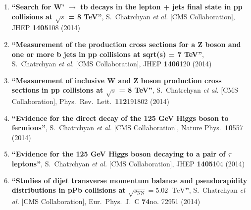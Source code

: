 \begin{enumerate}
\item%
{\bf ``Search for W' $\to $ tb decays in the lepton + jets final state in pp collisions at $\sqrt{s}$ = 8 TeV''}, 
  S.~Chatrchyan {\it et al.}  [CMS Collaboration], 
JHEP {\bf 1405}108 (2014) %


\item%
{\bf ``Measurement of the production cross sections for a Z boson and one or more b jets in pp collisions at sqrt(s) = 7 TeV''}, 
  S.~Chatrchyan {\it et al.}  [CMS Collaboration], 
JHEP {\bf 1406}120 (2014) %


\item%
{\bf ``Measurement of inclusive W and Z boson production cross sections in pp collisions at $\sqrt{s}$ = 8 TeV''}, 
  S.~Chatrchyan {\it et al.}  [CMS Collaboration], 
Phys.\ Rev.\ Lett.\  {\bf 112}191802 (2014) %


\item%
{\bf ``Evidence for the direct decay of the 125 GeV Higgs boson to fermions''}, 
  S.~Chatrchyan {\it et al.}  [CMS Collaboration], 
Nature Phys.\  {\bf 10}557 (2014) %


\item%
{\bf ``Evidence for the 125 GeV Higgs boson decaying to a pair of $\tau$ leptons''}, 
  S.~Chatrchyan {\it et al.}  [CMS Collaboration], 
JHEP {\bf 1405}104 (2014) %


\item%
{\bf ``Studies of dijet transverse momentum balance and pseudorapidity distributions in pPb collisions at $\sqrt{s_{\mathrm{NN}}} = 5.02$ $\,\text {TeV}$''}, 
  S.~Chatrchyan {\it et al.}  [CMS Collaboration], 
Eur.\ Phys.\ J.\ C {\bf 74}no. 72951 (2014) %



\end{enumerate}
